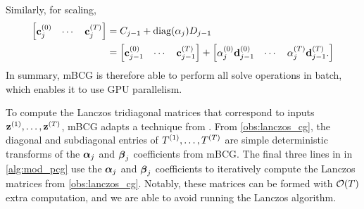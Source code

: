 %
Similarly, for scaling,
%
\begin{align*}
  \begin{bmatrix}
    \mathbf{c}_j^{(0)} & \cdots & \mathbf{c}_j^{(T)}
  \end{bmatrix}
  &=
  C_{j-1} + \text{diag}(\alpha_j) D_{j-1}
  \\
  &=
  \begin{bmatrix}
    \mathbf{c}_{j-1}^{(0)} & \cdots & \mathbf{c}_{j-1}^{(T)}
  \end{bmatrix}
  +
  \begin{bmatrix}
    \alpha_{j}^{(0)} \mathbf{d}_{j-1}^{(0)} & \cdots &  \alpha_{j}^{(T)} \mathbf{d}_{j-1}^{(T)}.
  \end{bmatrix}
\end{align*}
%
In summary, mBCG is therefore able to perform all solve operations in batch, which enables it to use GPU parallelism.

To compute the Lanczos tridiagonal matrices  that correspond to inputs $\mathbf{z}^{(1)}, \ldots, \mathbf{z}^{(T)}$, mBCG adapts a technique from \citet{saad2003iterative}.
From \cref{obs:lanczos_cg}, the diagonal and subdiagonal entries of $T^{(1)}, \ldots, T^{(T)}$ are simple deterministic transforms of the $\boldsymbol{\alpha}_j$ and $\boldsymbol{\beta}_j$ coefficients from mBCG.
The final three lines in {\color{\colornew} } in \cref{alg:mod_pcg} use the $\boldsymbol{\alpha}_j$ and $\boldsymbol{\beta}_j$ coefficients to iteratively compute the Lanczos matrices from \cref{obs:lanczos_cg}.
Notably, these matrices can be formed with $\bigo{T}$ extra computation, and we are able to avoid running the Lanczos algorithm.


